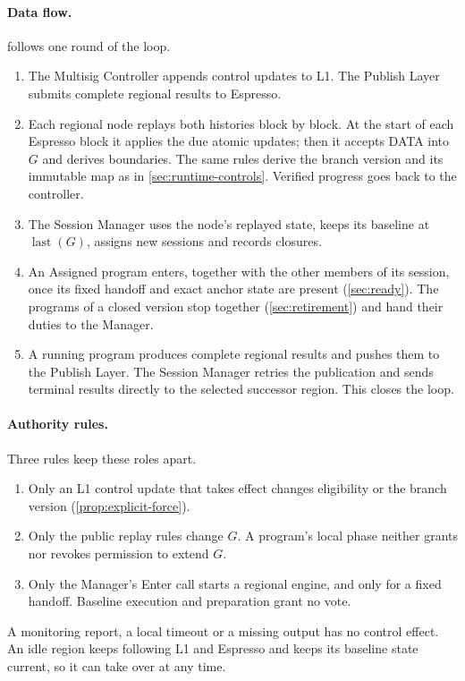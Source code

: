 \documentclass[11pt,a4paper]{article}
\begin{document}
\paragraph{Data flow.}
 follows one round of the loop.
\begin{enumerate}[label=(\arabic*)]
\item The Multisig Controller appends control updates to L1. The Publish
Layer submits complete regional results to Espresso.
\item Each regional node replays both histories
block by block. At the start of each Espresso block it applies the due
atomic updates; then it accepts DATA into $G$ and derives boundaries.
The same rules derive the branch version and its immutable map as in
\cref{sec:runtime-controls}. Verified progress goes back to the
controller.
\item The Session Manager uses the node's replayed state, keeps its
baseline at $\operatorname{last}(G)$, assigns new sessions and records
closures.
\item An Assigned program enters, together with the other members of
its session, once its fixed handoff and exact anchor state are present
(\cref{sec:ready}). The programs of a closed version stop together
(\cref{sec:retirement}) and hand their duties to the Manager.
\item A running program produces complete regional results and pushes
them to the Publish Layer. The Session Manager retries the publication
and sends terminal results directly to the selected successor region.
This closes the loop.
\end{enumerate}

\paragraph{Authority rules.}
Three rules keep these roles apart.
\begin{enumerate}[label=(A\arabic*)]
\item Only an L1 control update that takes effect changes eligibility or
the branch version (\cref{prop:explicit-force}).
\item Only the public replay rules change $G$. A program's local phase
neither grants nor revokes permission to extend $G$.
\item Only the Manager's Enter call starts a regional engine, and only
for a fixed handoff. Baseline execution and preparation grant no vote.
\end{enumerate}
A monitoring report, a local timeout or a missing output has no control
effect. An idle region keeps following L1 and Espresso and keeps its
baseline state current, so it can take over at any time.
\end{document}
